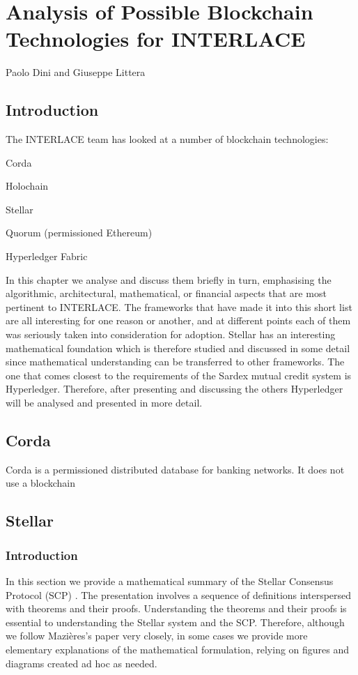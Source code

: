 \chapter{Analysis of Possible Blockchain Technologies for INTERLACE}
\label{ch:dlt}

\vspace{-1cm}
\begin{center}
Paolo Dini and Giuseppe Littera
\end{center}

\section{Introduction}
The INTERLACE team has looked at a number of blockchain technologies:
\begin{packed_item1}
\item Corda
\item Holochain
\item Stellar
\item Quorum (permissioned Ethereum)
\item Hyperledger Fabric
\end{packed_item1}
In this chapter we analyse and discuss them briefly in turn, emphasising the algorithmic, architectural,  mathematical, or financial aspects that are most pertinent to INTERLACE. The frameworks that have made it into this short list are all interesting for one reason or another, and at different points each of them was seriously taken into consideration for adoption. Stellar has an interesting mathematical foundation which is therefore studied and discussed in some detail since mathematical understanding can be transferred to other frameworks. The one that comes closest to the requirements of the Sardex mutual credit system is Hyperledger. Therefore, after presenting and discussing the others Hyperledger will be analysed and presented in more detail.


\section{Corda}
Corda is a permissioned distributed database for banking networks. It does not use a blockchain






\section{Stellar}
\subsection{Introduction}
In this section we provide a mathematical summary of the Stellar Consensus Protocol (SCP) \cite{Mazieres2016}. The presentation involves a sequence of definitions interspersed with theorems and their proofs. Understanding the theorems and their proofs is essential to understanding the Stellar system and the SCP. Therefore, although we follow Mazi\`eres's paper \cite{Mazieres2016} very closely, in some cases we provide more elementary explanations of the mathematical formulation, relying on figures and diagrams created ad hoc as needed.

